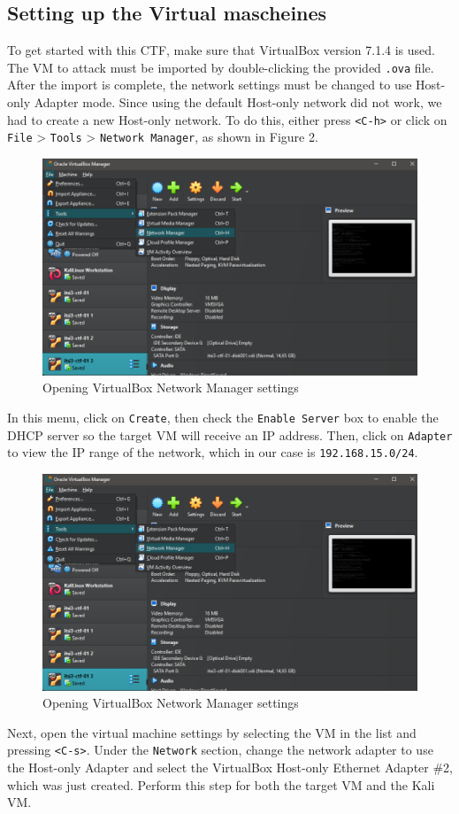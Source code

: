 \documentclass[a4paper]{article}
\newcommand{\abc}{\hfill \break}
\begin{document}
\subsection{Setting up the Virtual mascheines}
To get started with this CTF, make sure that VirtualBox version 7.1.4 is used. The VM to attack must be imported by double-clicking the provided \texttt{.ova} file. After the import is complete, the network settings must be changed to use Host-only Adapter mode. Since using the default Host-only network did not work, we had to create a new Host-only network. To do this, either press \texttt{<C-h>} or click on \texttt{File} > \texttt{Tools} > \texttt{Network Manager}, as shown in Figure 2.
\begin{figure}[h]
	\includegraphics[scale=0.4]{./images/openingNetworkManager.png}
	\centering
	\caption{Opening VirtualBox Network Manager settings}
\end{figure}\abc
In this menu, click on \texttt{Create}, then check the \texttt{Enable Server} box to enable the DHCP server so the target VM will receive an IP address. Then, click on \texttt{Adapter} to view the IP range of the network, which in our case is \texttt{192.168.15.0/24}. 
\begin{figure}[h]
	\includegraphics[scale=0.4]{./images/openingNetworkManager.png}
	\centering
	\caption{Opening VirtualBox Network Manager settings}
\end{figure}\abc
Next, open the virtual machine settings by selecting the VM in the list and pressing \texttt{<C-s>}. Under the \texttt{Network} section, change the network adapter to use the Host-only Adapter and select the VirtualBox Host-only Ethernet Adapter \#2, which was just created. Perform this step for both the target VM and the Kali VM.
\end{document}
